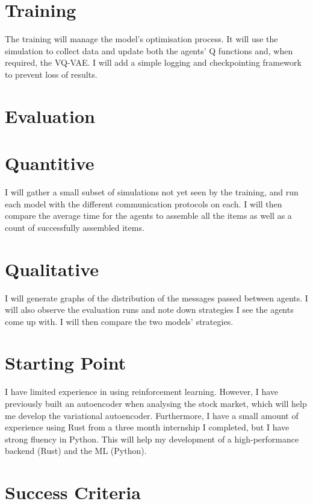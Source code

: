 \documentclass[20pt]{article}
\begin{document}
\section*{Training}
The training will manage the model's optimisation process. It will use the simulation to collect data and update both the agents' Q functions and, when required, the VQ-VAE. I will add a simple logging and checkpointing framework to prevent loss of results.

\section{Evaluation}

\section*{Quantitive}
I will gather a small subset of simulations not yet seen by the training, and run each model with the different communication protocols on each. I will then compare the average time for the agents to assemble all the items as well as a count of successfully assembled items.

\section*{Qualitative}
I will generate graphs of the distribution of the messages passed between agents. I will also observe the evaluation runs and note down strategies I see the agents come up with. I will then compare the two models' strategies.


\section{Starting Point}
I have limited experience in using reinforcement learning. However, I have previously built an autoencoder when analysing the stock market, which will help me develop the variational autoencoder. Furthermore, I have a small amount of experience using Rust from a three month internship I completed, but I have strong fluency in Python. This will help my development of a high-performance backend (Rust) and the ML (Python).


\section{Success Criteria}
\end{document}
